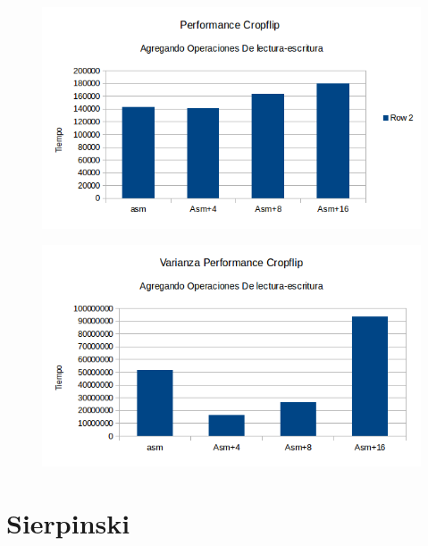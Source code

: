 \documentclass[a4paper]{article}
\begin{document}
\newpage
\begin{figure}[h!]
  \begin{center}
  \includegraphics[scale=0.66]{Graficos1.5/crop/pushpop/per.png}
  \label{nombreparareferenciar1}
  \end{center}
\end{figure}

\begin{figure}[h!]
  \begin{center}
  \includegraphics[scale=0.66]{Graficos1.5/crop/pushpop/var.png}
  \label{nombreparareferenciar1}
  \end{center}
\end{figure}



\newpage
\section{Sierpinski}
\end{document}
